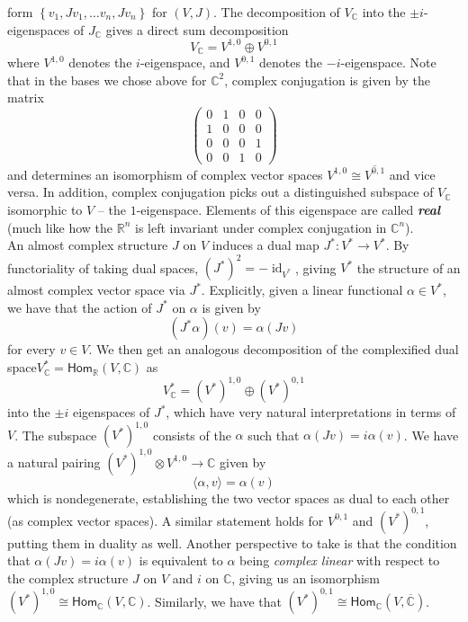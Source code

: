 \documentclass[psamsfonts, 12pt]{amsart}
\theoremstyle{definition}
\theoremstyle{remark}
\renewcommand{\hom}{\mathsf{Hom}}
\newcommand{\R}{\mathbb{R}}
\newcommand{\ib}[1]{\textbf{\textit{#1}}}
\newcommand{\C}{\mathbb{C}}
\newcommand{\set}[1]{\left\lbrace #1 \right\rbrace}
\DeclareMathOperator{\id}{id}
\begin{document}
form $\set{v_1, Jv_1, \ldots v_n, Jv_n}$ for $(V,J)$. The decomposition of $V_\C$ into
the $\pm i$-eigenspaces of $J_\C$ gives a direct sum decomposition
\[
V_\C = V^{1,0} \oplus V^{0,1}
\]
where $V^{1,0}$ denotes the $i$-eigenspace, and $V^{0,1}$ denotes the $-i$-eigenspace.
Note that in the bases we chose above for $\C^2$, complex conjugation is given by the
matrix
\[
\begin{pmatrix}
0 & 1 & 0 & 0\\
1 & 0 & 0 & 0 \\
0 & 0 & 0 & 1 \\
0 & 0 & 1 & 0
\end{pmatrix}
\]
and determines an isomorphism of complex vector spaces
$V^{1,0} \cong \overline{V^{0,1}}$ and vice versa. In addition, complex conjugation
picks out a distinguished subspace of $V_\C$ isomorphic to $V$ -- the $1$-eigenspace.
Elements of this eigenspace are called \ib{real} (much like how the $\R^n$
is left invariant under complex conjugation in $\C^n$). \\

An almost complex structure $J$ on $V$ induces a dual map $J^* : V^* \to V^*$. By
functoriality of taking dual spaces, $(J^*) ^2 = -\id_{V^*}$, giving $V^*$ the
structure of an almost complex vector space via $J^*$. Explicitly, given a linear
functional $\alpha \in V^*$, we have that the action of $J^*$ on $\alpha$ is given
by
\[
(J^*\alpha)(v) = \alpha(Jv)
\]
for every $v \in V$. We then get an analogous decomposition of the complexified
dual space$ V^*_\C = \hom_\R(V,\C)$ as
\[
V^*_\C = (V^*)^{1,0} \oplus (V^*)^{0,1}
\]
into the $\pm i$ eigenspaces of $J^*$, which have very natural interpretations in
terms of $V$. The subspace $(V^*)^{1,0}$ consists of the $\alpha$ such that
$\alpha(Jv) = i\alpha(v)$. We have a natural pairing
 $(V^*)^{1,0} \otimes V^{1,0} \to \C$
given by
\[
\langle \alpha,v \rangle = \alpha(v)
\]
which is nondegenerate, establishing the two vector spaces as dual to each other (as
complex vector spaces). A similar statement holds for $V^{0,1}$ and $(V^*)^{0,1}$,
putting them in duality as well. Another perspective to take is that the condition
that $\alpha(Jv) = i\alpha(v)$ is equivalent to $\alpha$ being \emph{complex linear}
with respect to the complex structure $J$ on $V$ and $i$ on $\C$, giving us an
isomorphism $(V^*)^{1,0} \cong \hom_\C(V,\C)$. Similarly, we have that
$(V^*)^{0,1} \cong \hom_{\C}(V,\overline{\C})$.\\
\end{document}

